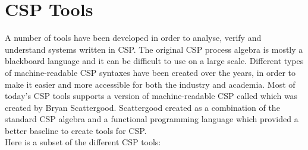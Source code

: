 \section{CSP Tools}
A number of tools have been developed in order to analyse, verify and understand systems written in CSP. The original CSP process algebra is mostly a blackboard language and it can be difficult to use on a large scale. Different types of machine-readable CSP syntaxes have been created over the years, in order to make it easier and more accessible for both the industry and academia. Most of today's CSP tools supports a version of machine-readable CSP called \cspm{} which was created by Bryan Scattergood\cite{Scattergood1998}. Scattergood created \cspm{} as a combination of the standard CSP algebra and a functional programming language which provided a better baseline to create tools for CSP.\\
Here is a subset of the different CSP tools:
